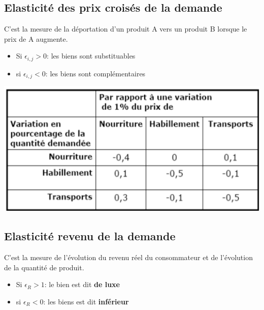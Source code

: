 \subsection{Elasticité des prix croisés de la demande}
C'est la mesure de la déportation d'un produit A vers un produit B lorsque le prix de A augmente.
\begin{center}
    \huge{}
\end{center}
\begin{itemize}
    \item Si $\epsilon_{i,j} > 0 $: les biens sont substituables
    \item si $\epsilon_{i,j} < 0 $: les biens sont complémentaires
\end{itemize}
\begin{center}
    \includegraphics[scale=0.8]{Pics/elasticite_prix_croises.png}
\end{center}
\subsection{Elasticité revenu de la demande}
C'est la mesure de l'évolution du revenu réel du consommateur et de l'évolution de la quantité de produit.
\begin{center}
    \huge{}
\end{center}
\begin{itemize}
    \item Si $\epsilon_{R} > 1 $: le bien est dit \textbf{de luxe}
    \item si $\epsilon_{R} < 0 $: les biens est dit \textbf{inférieur}
\end{itemize}
\newpage
